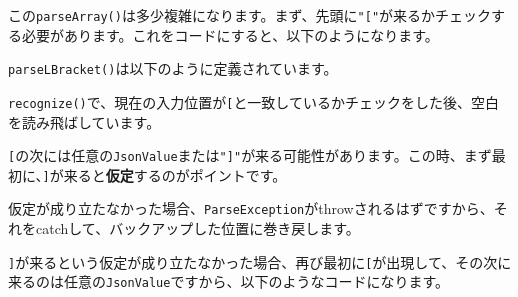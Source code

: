 この\texttt{parseArray()}は多少複雑になります。まず、先頭に\texttt{"{[}"}が来るかチェックする必要があります。これをコードにすると、以下のようになります。

\begin{Shaded}
\begin{Highlighting}[]
\NormalTok{();}
\end{Highlighting}
\end{Shaded}

\texttt{parseLBracket()}は以下のように定義されています。

\begin{Shaded}
\begin{Highlighting}[]
   \NormalTok{() \{}
    \NormalTok{(}\StringTok{"["}\NormalTok{);}
    \NormalTok{();}
\NormalTok{\}}
\end{Highlighting}
\end{Shaded}

\texttt{recognize()}で、現在の入力位置が\texttt{{[}}と一致しているかチェックをした後、空白を読み飛ばしています。

\texttt{{[}}の次には任意の\texttt{JsonValue}または\texttt{"{]}"}が来る可能性があります。この時、まず最初に、\texttt{{]}}が来ると\textbf{仮定}するのがポイントです。

\begin{Shaded}
\begin{Highlighting}[]
        \NormalTok{ \{}
            \NormalTok{();}
            \NormalTok{();}
             \NormalTok{(} \NormalTok{\textless{}\textgreater{}());}
\NormalTok{        \} }\NormalTok{ (}
\NormalTok{        \}}
\end{Highlighting}
\end{Shaded}

仮定が成り立たなかった場合、\texttt{ParseException}がthrowされるはずですから、それをcatchして、バックアップした位置に巻き戻します。

\texttt{{]}}が来るという仮定が成り立たなかった場合、再び最初に\texttt{{[}}が出現して、その次に来るのは任意の\texttt{JsonValue}ですから、以下のようなコードになります。

